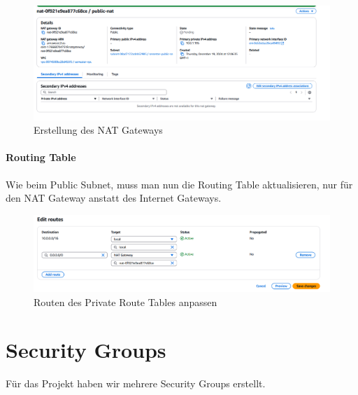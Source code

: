 \documentclass[a4paper,12pt]{article}
\begin{document}
\begin{figure}[h!]
	\centering
	\includegraphics[width=\textwidth]{data/Create_Nat2.png}
	\caption{Erstellung des NAT Gateways}
	\label{fig:Erstellung des NAT Gateways}
\end{figure}

\paragraph{Routing Table}
Wie beim Public Subnet, muss man nun die Routing Table aktualisieren, nur für den NAT Gateway anstatt des Internet Gateways.
\begin{figure}[h!]
	\centering
	\includegraphics[width=\textwidth]{data/Edit_Routes_Private.png}
	\caption{Routen des Private Route Tables anpassen}
	\label{fig:Attach Routen des Private Route Tables anpassen}
\end{figure}

\newpage

\section{Security Groups}
Für das Projekt haben wir mehrere Security Groups erstellt.
\end{document}
